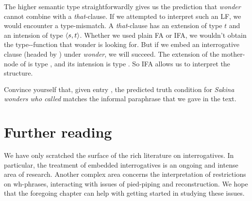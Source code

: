 The higher semantic type straightforwardly gives us the prediction that
\emph{wonder} cannot combine with a \emph{that}-clause. If we attempted to
interpret such an LF, we would encounter a type-mismatch. A \emph{that}-clause
has an extension of type $t$ and an intension of type $\langle s,t \rangle$. Whether we
used plain FA or IFA, we wouldn't obtain the type--function that
wonder is looking for. But if we embed an interrogative clause (headed by \ans)
under \emph{wonder}, we will succeed. The extension of the mother-node of \ans
is type , and its intension is type . So IFA allows us to
interpret the structure.

\begin{exercise}
  Convince yourself that, given entry \Last, the predicted truth condition for
  \emph{Sakina wonders who called} matches the informal paraphrase that we gave
  in the text.
\end{exercise}

\section{Further reading}

We have only scratched the surface of the rich literature on interrogatives. In
particular, the treatment of embedded interrogatives is an ongoing and intense
area of research. Another complex area concerns the interpretation of
restrictions on wh-phrases, interacting with issues of pied-piping and
reconstruction. We hope that the foregoing chapter can help with getting started
in studying these issues.





